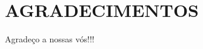 \documentclass[a4paper, 10pt, conference]{ieeeconf}    %
\begin{document}


\maketitle
\thispagestyle{empty}
\pagestyle{empty}












\addtolength{\textheight}{-12cm}   %








\section*{AGRADECIMENTOS}

Agradeço a nossas vós!!!






\end{document}
